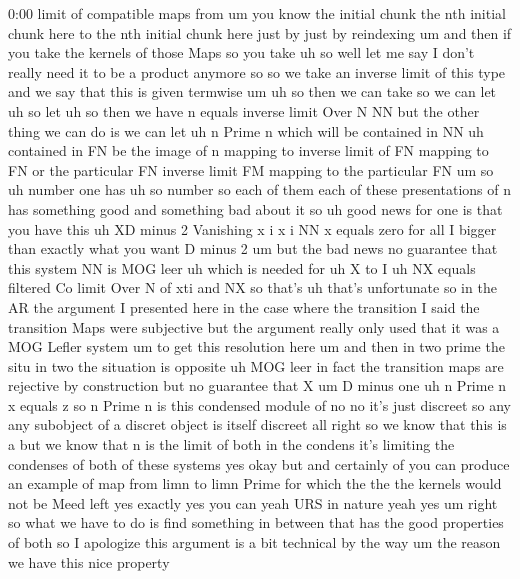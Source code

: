 \begin{unfinished}{0:00}
limit  of  compatible  maps  from  um  you
know  the  initial  chunk  the  nth  initial
chunk  here  to  the  nth  initial  chunk  here
just  by  just  by
reindexing  um  and  then  if  you  take  the
kernels  of  those  Maps  so  you  take  uh
so  well  let  me  say  I  don't  really  need
it  to  be  a  product  anymore
so  so  we  take  an  inverse  limit  of  this
type  and  we  say  that  this  is  given
termwise
um  uh  so  then  we  can  take  so  we  can  let
uh  so
let  uh
so  then  we  have  n  equals  inverse  limit
Over  N
NN  but  the  other  thing  we  can  do  is  we
can  let  uh  n  Prime  n  which  will  be
contained  in  NN  uh  contained  in  FN  be
the
image  of  n  mapping  to  inverse  limit  of
FN  mapping  to  FN  or  the  particular  FN
inverse  limit  FM  mapping  to  the
particular  FN
um
so  uh  number  one  has  uh  so  number  so
each  of  them  each  of  these  presentations
of  n  has  something  good  and  something
bad  about  it  so  uh  good  news  for
one  is  that  you  have  this  uh  XD  minus  2
Vanishing  x  i  x  i  NN  x  equals  zero  for
all  I  bigger  than  exactly  what  you  want
D  minus
2  um  but  the  bad
news  no
guarantee  that  this  system  NN  is  MOG
leer  uh  which  is  needed  for
uh  X  to
I  uh  NX  equals  filtered  Co  limit  Over  N
of
xti  and
NX  so  that's  uh  that's  unfortunate  so  in
the  AR  the  argument  I  presented  here  in
the  case  where  the  transition  I  said  the
transition  Maps  were  subjective  but  the
argument  really  only  used  that  it  was  a
MOG  Lefler  system  um  to  get  this
resolution  here  um  and  then  in  two  prime
the  situ  in  two  the  situation  is
opposite  uh  MOG  leer  in  fact  the
transition  maps  are  rejective  by
construction  but  no
guarantee  that
X  um  D  minus  one  uh  n  Prime  n  x  equals
z  so  n  Prime  n  is  this  condensed  module
of
no  no  it's  just  discreet  so  any  any
subobject  of  a  discret  object  is  itself
discreet  all
right  so  we  know  that  this  is
a  but  we  know  that  n  is  the  limit  of
both  in  the  condens  it's  limiting  the
condenses  of  both  of  these  systems  yes
okay  but  and  certainly  of  you  can
produce  an  example  of  map  from  limn  to
limn  Prime  for  which  the  the  the  kernels
would  not  be  Meed  left  yes  exactly  yes
you  can  yeah  URS  in  nature  yeah
yes
um  right  so  what  we  have  to  do  is  find
something  in  between  that  has  the  good
properties  of  both  so  I  apologize  this
argument  is  a  bit  technical
by  the  way
um  the  reason  we  have  this  nice  property

\end{unfinished}
